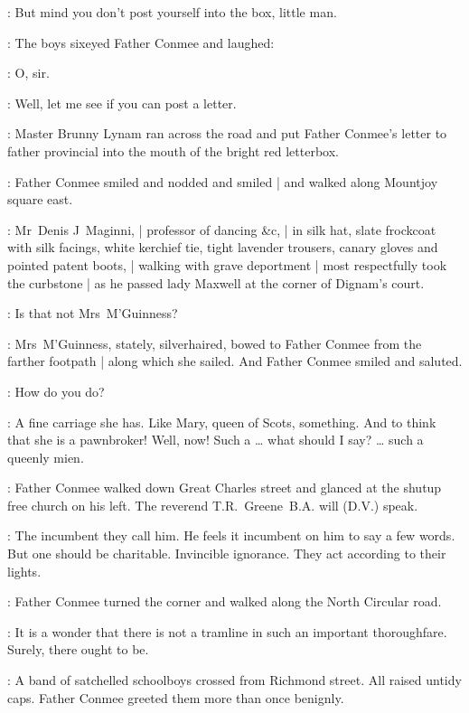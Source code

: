 \conmee:
But mind you don't post yourself into the box, little man.

:
The boys sixeyed Father Conmee and laughed:

\Boys:
O, sir.%

\conmee:
Well, let me see if you can post a letter.

:
Master Brunny Lynam ran across the road
and put Father Conmee's letter to father provincial
into the mouth of the bright red letterbox.

:
Father Conmee smiled and nodded and smiled |
and walked along Mountjoy square east.

\begin{interject}
    :
    Mr~Denis J~Maginni, |
    professor of dancing \&c, |
    in silk hat,
    slate frockcoat with silk facings,
    white kerchief tie,
    tight lavender trousers,
    canary gloves
    and pointed patent boots, |
    walking with grave deportment |
    most respectfully took the curbstone |
    as he passed lady Maxwell
    at the corner of Dignam's court.
\end{interject}%

\conmeeint:
Is that not Mrs~M'Guinness?

:
Mrs~M'Guinness,
stately, silverhaired,
bowed to Father Conmee from the farther footpath |
along which she sailed.
And Father Conmee smiled and saluted.

\conmee:
How do you do?

\conmeeint:
A fine carriage she has.
Like Mary, queen of Scots, something.
And to think that she is a pawnbroker!
Well, now!
Such a \ldots
what should I say? \ldots
such a queenly mien.

:
Father Conmee walked down Great Charles street
and glanced at the shutup free church on his left.
The reverend T.R.~Greene~B.A. will (D.V.) speak.

\conmeeint:
The incumbent they call him.%
He feels it incumbent on him to say a few words.
But one should be charitable.
Invincible ignorance.
They act according to their lights.

:
Father Conmee turned the corner
and walked along the North Circular road.

\conmeeint:
It is a wonder that there is not a tramline
in such an important thoroughfare.
Surely, there ought to be.

:
A band of satchelled schoolboys crossed from Richmond street.
All raised untidy caps.
Father Conmee greeted them more than once benignly.

